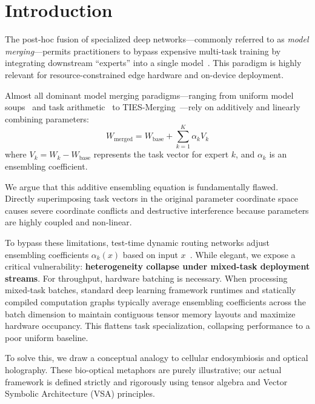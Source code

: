 \section{Introduction}
\label{sec:intro}

The post-hoc fusion of specialized deep networks—commonly referred to as \textit{model merging}—permits practitioners to bypass expensive multi-task training by integrating downstream ``experts'' into a single model~\cite{wortsman2022modelsoups, ilharco2022editing}. This paradigm is highly relevant for resource-constrained edge hardware and on-device deployment.

Almost all dominant model merging paradigms—ranging from uniform model soups~\cite{wortsman2022modelsoups} and task arithmetic~\cite{ilharco2022editing} to TIES-Merging~\cite{yadav2023ties}—rely on additively and linearly combining parameters:
\begin{equation}
W_{\text{merged}} = W_{\text{base}} + \sum_{k=1}^K \alpha_k V_k
\end{equation}
where $V_k = W_k - W_{\text{base}}$ represents the task vector for expert $k$, and $\alpha_k$ is an ensembling coefficient.

We argue that this additive ensembling equation is fundamentally flawed. Directly superimposing task vectors in the original parameter coordinate space causes severe coordinate conflicts and destructive interference because parameters are highly coupled and non-linear.

To bypass these limitations, test-time dynamic routing networks adjust ensembling coefficients $\alpha_k(x)$ based on input $x$~\cite{chosetme2024qws}. While elegant, we expose a critical vulnerability: \textbf{heterogeneity collapse under mixed-task deployment streams}. For throughput, hardware batching is necessary. When processing mixed-task batches, standard deep learning framework runtimes and statically compiled computation graphs typically average ensembling coefficients across the batch dimension to maintain contiguous tensor memory layouts and maximize hardware occupancy. This flattens task specialization, collapsing performance to a poor uniform baseline.

To solve this, we draw a conceptual analogy to cellular endosymbiosis and optical holography. These bio-optical metaphors are purely illustrative; our actual framework is defined strictly and rigorously using tensor algebra and Vector Symbolic Architecture (VSA) principles.

